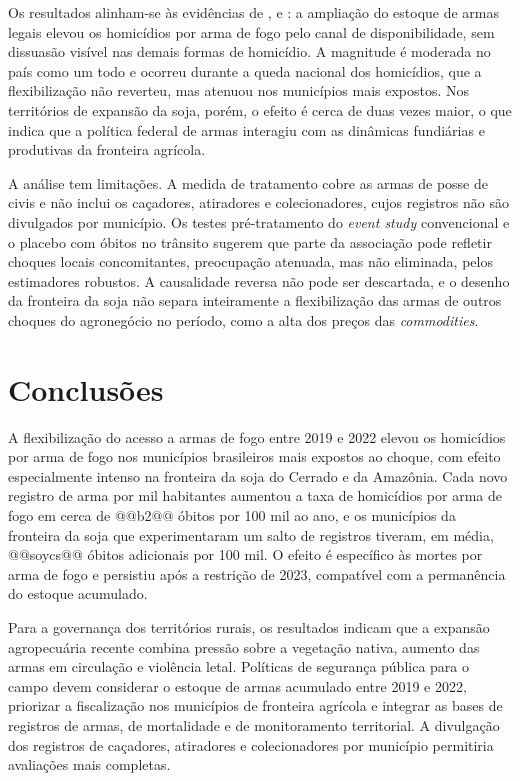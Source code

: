 \documentclass[12pt,a4paper]{article}
\begin{document}
Os resultados alinham-se às evidências de \citet{duggan2001}, \citet{cook2006} e \citet{cerqueira2012}: a ampliação do estoque de armas legais elevou os homicídios por arma de fogo pelo canal de disponibilidade, sem dissuasão visível nas demais formas de homicídio. A magnitude é moderada no país como um todo e ocorreu durante a queda nacional dos homicídios, que a flexibilização não reverteu, mas atenuou nos municípios mais expostos. Nos territórios de expansão da soja, porém, o efeito é cerca de duas vezes maior, o que indica que a política federal de armas interagiu com as dinâmicas fundiárias e produtivas da fronteira agrícola.

A análise tem limitações. A medida de tratamento cobre as armas de posse de civis e não inclui os caçadores, atiradores e colecionadores, cujos registros não são divulgados por município. Os testes pré-tratamento do \textit{event study} convencional e o placebo com óbitos no trânsito sugerem que parte da associação pode refletir choques locais concomitantes, preocupação atenuada, mas não eliminada, pelos estimadores robustos. A causalidade reversa não pode ser descartada, e o desenho da fronteira da soja não separa inteiramente a flexibilização das armas de outros choques do agronegócio no período, como a alta dos preços das \textit{commodities}.

\section{Conclusões}

A flexibilização do acesso a armas de fogo entre 2019 e 2022 elevou os homicídios por arma de fogo nos municípios brasileiros mais expostos ao choque, com efeito especialmente intenso na fronteira da soja do Cerrado e da Amazônia. Cada novo registro de arma por mil habitantes aumentou a taxa de homicídios por arma de fogo em cerca de @@b2@@ óbitos por 100 mil ao ano, e os municípios da fronteira da soja que experimentaram um salto de registros tiveram, em média, @@soycs@@ óbitos adicionais por 100 mil. O efeito é específico às mortes por arma de fogo e persistiu após a restrição de 2023, compatível com a permanência do estoque acumulado.

Para a governança dos territórios rurais, os resultados indicam que a expansão agropecuária recente combina pressão sobre a vegetação nativa, aumento das armas em circulação e violência letal. Políticas de segurança pública para o campo devem considerar o estoque de armas acumulado entre 2019 e 2022, priorizar a fiscalização nos municípios de fronteira agrícola e integrar as bases de registros de armas, de mortalidade e de monitoramento territorial. A divulgação dos registros de caçadores, atiradores e colecionadores por município permitiria avaliações mais completas.



\end{document}
